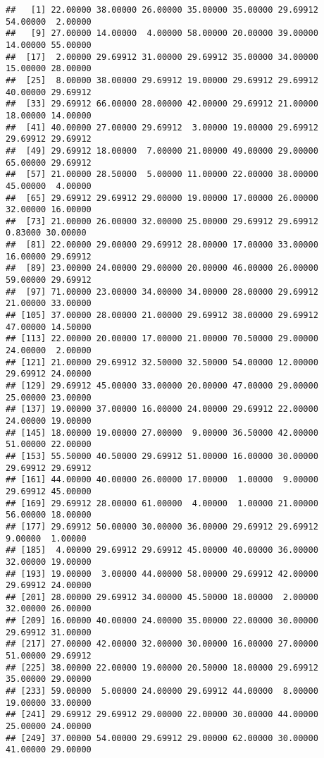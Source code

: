 \documentclass[
]{article}
\begin{document}
\begin{verbatim}
##   [1] 22.00000 38.00000 26.00000 35.00000 35.00000 29.69912 54.00000  2.00000
##   [9] 27.00000 14.00000  4.00000 58.00000 20.00000 39.00000 14.00000 55.00000
##  [17]  2.00000 29.69912 31.00000 29.69912 35.00000 34.00000 15.00000 28.00000
##  [25]  8.00000 38.00000 29.69912 19.00000 29.69912 29.69912 40.00000 29.69912
##  [33] 29.69912 66.00000 28.00000 42.00000 29.69912 21.00000 18.00000 14.00000
##  [41] 40.00000 27.00000 29.69912  3.00000 19.00000 29.69912 29.69912 29.69912
##  [49] 29.69912 18.00000  7.00000 21.00000 49.00000 29.00000 65.00000 29.69912
##  [57] 21.00000 28.50000  5.00000 11.00000 22.00000 38.00000 45.00000  4.00000
##  [65] 29.69912 29.69912 29.00000 19.00000 17.00000 26.00000 32.00000 16.00000
##  [73] 21.00000 26.00000 32.00000 25.00000 29.69912 29.69912  0.83000 30.00000
##  [81] 22.00000 29.00000 29.69912 28.00000 17.00000 33.00000 16.00000 29.69912
##  [89] 23.00000 24.00000 29.00000 20.00000 46.00000 26.00000 59.00000 29.69912
##  [97] 71.00000 23.00000 34.00000 34.00000 28.00000 29.69912 21.00000 33.00000
## [105] 37.00000 28.00000 21.00000 29.69912 38.00000 29.69912 47.00000 14.50000
## [113] 22.00000 20.00000 17.00000 21.00000 70.50000 29.00000 24.00000  2.00000
## [121] 21.00000 29.69912 32.50000 32.50000 54.00000 12.00000 29.69912 24.00000
## [129] 29.69912 45.00000 33.00000 20.00000 47.00000 29.00000 25.00000 23.00000
## [137] 19.00000 37.00000 16.00000 24.00000 29.69912 22.00000 24.00000 19.00000
## [145] 18.00000 19.00000 27.00000  9.00000 36.50000 42.00000 51.00000 22.00000
## [153] 55.50000 40.50000 29.69912 51.00000 16.00000 30.00000 29.69912 29.69912
## [161] 44.00000 40.00000 26.00000 17.00000  1.00000  9.00000 29.69912 45.00000
## [169] 29.69912 28.00000 61.00000  4.00000  1.00000 21.00000 56.00000 18.00000
## [177] 29.69912 50.00000 30.00000 36.00000 29.69912 29.69912  9.00000  1.00000
## [185]  4.00000 29.69912 29.69912 45.00000 40.00000 36.00000 32.00000 19.00000
## [193] 19.00000  3.00000 44.00000 58.00000 29.69912 42.00000 29.69912 24.00000
## [201] 28.00000 29.69912 34.00000 45.50000 18.00000  2.00000 32.00000 26.00000
## [209] 16.00000 40.00000 24.00000 35.00000 22.00000 30.00000 29.69912 31.00000
## [217] 27.00000 42.00000 32.00000 30.00000 16.00000 27.00000 51.00000 29.69912
## [225] 38.00000 22.00000 19.00000 20.50000 18.00000 29.69912 35.00000 29.00000
## [233] 59.00000  5.00000 24.00000 29.69912 44.00000  8.00000 19.00000 33.00000
## [241] 29.69912 29.69912 29.00000 22.00000 30.00000 44.00000 25.00000 24.00000
## [249] 37.00000 54.00000 29.69912 29.00000 62.00000 30.00000 41.00000 29.00000

\end{verbatim}
\end{document}
